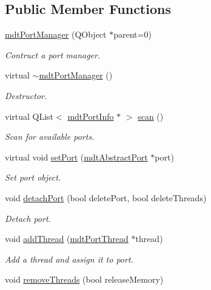 \subsection*{Public Member Functions}
\begin{DoxyCompactItemize}
\item 
\hyperlink{classmdt_port_manager_a5ec36523089b7528d973e29cdbc64d01}{mdtPortManager} (QObject $\ast$parent=0)
\begin{DoxyCompactList}\small\item\em Contruct a port manager. \end{DoxyCompactList}\item 
virtual \hyperlink{classmdt_port_manager_adf797f8fd7a3ffdc000890a224e4c1b6}{$\sim$mdtPortManager} ()
\begin{DoxyCompactList}\small\item\em Destructor. \end{DoxyCompactList}\item 
virtual QList$<$ \hyperlink{classmdt_port_info}{mdtPortInfo} $\ast$ $>$ \hyperlink{classmdt_port_manager_ad56afb411ab5468005fca04767557ece}{scan} ()
\begin{DoxyCompactList}\small\item\em Scan for available ports. \end{DoxyCompactList}\item 
virtual void \hyperlink{classmdt_port_manager_afcd156b2d0c9d340999935efb6cd8cb6}{setPort} (\hyperlink{classmdt_abstract_port}{mdtAbstractPort} $\ast$port)
\begin{DoxyCompactList}\small\item\em Set port object. \end{DoxyCompactList}\item 
void \hyperlink{classmdt_port_manager_a39cb4af4aedc0b6b7c4d4f53002c3fd1}{detachPort} (bool deletePort, bool deleteThreads)
\begin{DoxyCompactList}\small\item\em Detach port. \end{DoxyCompactList}\item 
void \hyperlink{classmdt_port_manager_ab62591409d019a4a2576b4310c411b8f}{addThread} (\hyperlink{classmdt_port_thread}{mdtPortThread} $\ast$thread)
\begin{DoxyCompactList}\small\item\em Add a thread and assign it to port. \end{DoxyCompactList}\item 
void \hyperlink{classmdt_port_manager_aaa0a474183bcae0fff4fb9ef43023c25}{removeThreads} (bool releaseMemory)

\end{DoxyCompactItemize}
